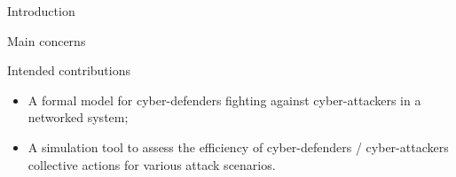 \begin{frame}[allowframebreaks]{Introduction}
\begin{alertblock}{Main concerns}
        \end{alertblock}

        \begin{block}{Intended contributions}
            \begin{itemize}
                \item A formal model for cyber-defenders fighting against cyber-attackers in a networked system;
                \item A simulation tool to assess the efficiency of cyber-defenders / cyber-attackers collective actions for various attack scenarios.
            \end{itemize}
        \end{block}
 
	\end{frame}